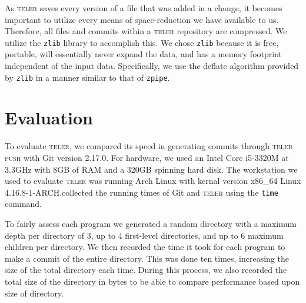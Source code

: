 \documentclass[11pt, letterpaper]{article}
\begin{document}
\begin{multicols}{2}
  As \textsc{teler} saves every version of a file that was added in a
  change, it becomes important to utilize every means of
  space-reduction we have available to us. Therefore, all files and
  commits within a \textsc{teler} repository are compressed. We
  utilize the \texttt{zlib} library to accomplish this. We chose
  \texttt{zlib} because it is free, portable, will essentially never
  expand the data, and has a memory footprint independent of the
  input data. Specifically, we use the deflate algorithm provided by
  \texttt{zlib} in a manner similar to that of \texttt{zpipe}.

  \section{Evaluation}
  \label{sec:evaluation}
  To evaluate \textsc{teler}, we compared its speed in generating
  commits through \textsc{teler push} with Git version 2.17.0. For
  hardware, we used an Intel Core i5-3320M at 3.3GHz with 8GB of RAM
  and a 320GB spinning hard disk. The workstation we used to evaluate
  \textsc{teler} was running Arch Linux with kernal version x86\_64
  Linux 4.16.8-1-ARCH.\@We collected the running times of Git and
  \textsc{teler} using the \texttt{time} command.

  To fairly assess each program we generated a random directory with a
  maximum depth per directory of 3, up to 4 first-level directories,
  and up to 6 maximum children per directory. We then recorded the
  time it took for each program to make a commit of the entire
  directory. This was done ten times, increasing the size of the total
  directory each time. During this process, we also recorded the total
  size of the directory in bytes to be able to compare performance
  based upon size of directory.



\end{multicols}
\end{document}
